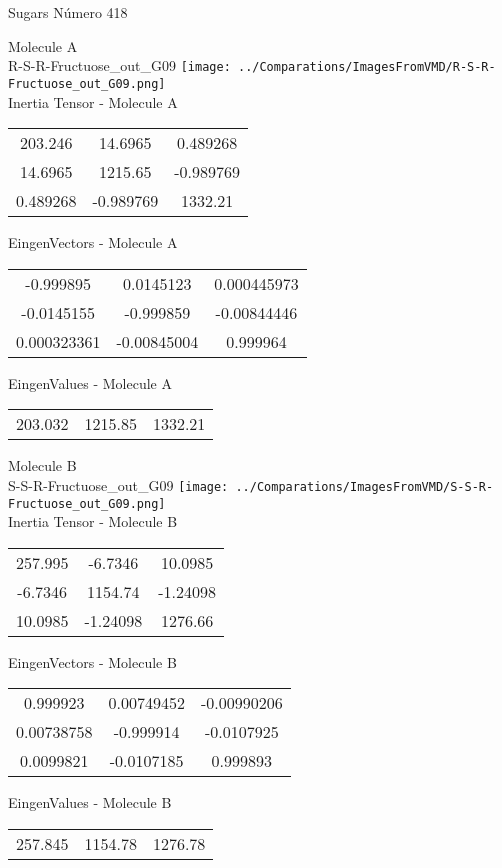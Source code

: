 \vtab[-2cm]
\begin{center}
{\large Sugars \tab Número 418}
\end{center}
\begin{multicols}{2}
\begin{center}

Molecule A \\ 
R-S-R-Fructuose\_out\_G09
\texttt{[image: ../Comparations/ImagesFromVMD/R-S-R-Fructuose\_out\_G09.png]}
\\
Inertia Tensor - Molecule A \\
\vtab

\begin{tabular}{|c c c|}
203.246	 & 	14.6965	 & 	0.489268	 \\
14.6965	 & 	1215.65	 & 	-0.989769	 \\
0.489268	 & 	-0.989769	 & 	1332.21
\end{tabular}

\vtab
 EingenVectors - Molecule A     \\
\vtab
\begin{tabular}{|c c c|}
-0.999895	 & 	0.0145123	 & 	0.000445973	 \\
-0.0145155	 & 	-0.999859	 & 	-0.00844446	 \\
0.000323361	 & 	-0.00845004	 & 	0.999964
\end{tabular}

\vtab
 EingenValues - Molecule A     \\
\vtab
\begin{tabular}{|c c c|}
203.032	 & 	1215.85	 & 	1332.21	 \\
\end{tabular}
\columnbreak

Molecule B \\ 
S-S-R-Fructuose\_out\_G09
\texttt{[image: ../Comparations/ImagesFromVMD/S-S-R-Fructuose\_out\_G09.png]}
\\
Inertia Tensor - Molecule B \\
\vtab

\begin{tabular}{|c c c|}
257.995	 & 	-6.7346	 & 	10.0985	 \\
-6.7346	 & 	1154.74	 & 	-1.24098	 \\
10.0985	 & 	-1.24098	 & 	1276.66
\end{tabular}

\vtab
 EingenVectors - Molecule B     \\
\vtab
\begin{tabular}{|c c c|}
0.999923	 & 	0.00749452	 & 	-0.00990206	 \\
0.00738758	 & 	-0.999914	 & 	-0.0107925	 \\
0.0099821	 & 	-0.0107185	 & 	0.999893
\end{tabular}

\vtab
 EingenValues - Molecule B     \\
\vtab
\begin{tabular}{|c c c|}
257.845	 & 	1154.78	 & 	1276.78	 \\
\end{tabular}

\end{center}
\end{multicols}
